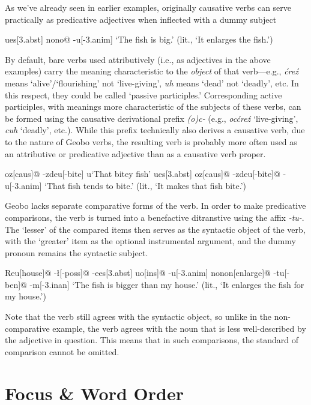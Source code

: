 \documentclass[a4paper,11pt,oneside,openany]{memoir}
\begin{document}
As we've already seen in earlier examples, originally causative verbs can serve practically as predicative adjectives when inflected with a dummy subject

\ex
\begingl
\Engma u\vz[fish]
es[\sc 3.abst]
nono\vn[enlarge]@
-\vs u[\sc -3.anim]
\glft `The fish is big.' (lit., `It enlarges the fish.')
\endgl
\xe

By default, bare verbs used attributively (i.e., as adjectives in the above examples) carry the meaning characteristic to the \textit{object} of that verb---e.g., \textit{\'cre\'z} means `alive'/`flourishing' not `live-giving', \textit{uh} means `dead' not `deadly', etc. In this respect, they could be called `passive participles.' Corresponding active participles, with meanings more characteristic of the subjects of these verbs, can be formed using the causative derivational prefix \textit{(o)c-} (e.g., \textit{oc\'cre\'z} `live-giving', \textit{cuh} `deadly', etc.). While this prefix technically also derives a causative verb, due to the nature of Geobo{\engma} verbs, the resulting verb is probably more often used as an attributive or predicative adjective than as a causative verb proper.

\pex
\a
\begingl
oz[\sc caus]@
-zdeu[-bite]
\engma u\vz[fish]
\glft `That bitey fish'
\endgl
\a
\begingl
\engma u\vz[fish]
es[\sc 3.abst]
oz[\sc caus]@
-zdeu[-bite]@
-\vs u[\sc -3.anim]
\glft `That fish tends to bite.' (lit., `It makes that fish bite.')
\endgl
\xe

Geobo{\engma} lacks separate comparative forms of the verb. In order to make predicative comparisons, the verb is turned into a benefactive ditranstive using the affix \textit{-tu-}. The `lesser' of the compared items then serves as the syntactic object of the verb, with the `greater' item as the optional instrumental argument, and the dummy pronoun remains the syntactic subject.

\ex 
\begingl
Reu[house]@
-\l[\sc -poss]@
-e\vd[\sc -1]
es[\sc 3.abst]
\engma u\vz[fish] 
\vc o[\sc ins]@
-\vs u[\sc -3.anim]
nonon[enlarge]@
-tu[\sc -ben]@
-m[\sc -3.inan]
\glft `The fish is bigger than my house.' (lit., `It enlarges the fish for my house.')
\endgl
\xe

Note that the verb still agrees with the syntactic object, so unlike in the non-comparative example, the verb agrees with the noun that is less well-described by the adjective in question. This means that in such comparisons, the standard of comparison cannot be omitted.

\section{Focus \& Word Order}\label{focus}
\end{document}

